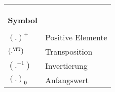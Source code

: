 \begin{supertabular*}{\textwidth}{ll}
\\
\\
 \\
\\
\hline 
{\bfseries Symbol}					&		{\bfseries {}} \\
\hline
\\
$(.)^+$			&	Positive Elemente\\
$(.^\TT )$			&	Transposition\\
$(.^{-1})$			&	Invertierung\\
$(.)_0$			&	Anfangswert\\
\end{supertabular*}

\cleardoublepage %
\pagestyle{scrheadings}
